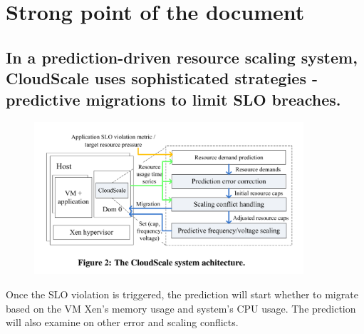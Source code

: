 \documentclass[acmlarge]{acmart}
\begin{document}
\maketitle
\section{Strong point of the document}
\subsection{In a prediction-driven resource scaling system, CloudScale uses sophisticated strategies - predictive migrations to limit SLO breaches.}
\begin{figure}[H]
  \centering
  \includegraphics[width=10cm]{./overview.png}
\end{figure}
Once the SLO violation is triggered, the prediction will start whether to migrate based on the VM Xen's memory usage and system's CPU usage. The prediction will also examine on other error and scaling conflicts.
\end{document}
